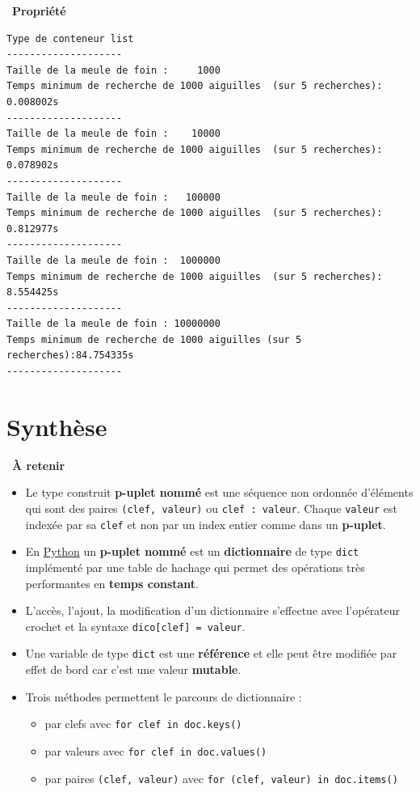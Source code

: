 \documentclass[
  11pt,
]{article}
\newcommand{\passthrough}[1]{#1}
\providecommand{\tightlist}{%
  \setlength{\itemsep}{0pt}\setlength{\parskip}{0pt}}
\newcounter{prop}
\newenvironment{propriete}[1]
{\par \medskip   \addtocounter{prop}{1} \noindent  
\begin{bclogo}[arrondi =0.1,  ombre = true, barre=none, logo=\bcbook, marge=4]{~\textbf{Propriété} \textbf{\theprop} {\itshape #1} }   \par}
{
\end{bclogo}
 \par \bigskip }
\newcounter{cours}
\newenvironment{memo}[1]
{\par \medskip    \noindent  
\begin{bclogo}[arrondi =0.1,  ombre = true, barre=none, logo=\bccle, marge=4]{~\textbf{À retenir}  {\itshape #1} }  \par}
{
\end{bclogo}
 \par \bigskip }
\begin{document}
\begin{propriete}{}
\begin{lstlisting}
Type de conteneur list
--------------------
Taille de la meule de foin :     1000
Temps minimum de recherche de 1000 aiguilles  (sur 5 recherches): 0.008002s
--------------------
Taille de la meule de foin :    10000
Temps minimum de recherche de 1000 aiguilles  (sur 5 recherches): 0.078902s
--------------------
Taille de la meule de foin :   100000
Temps minimum de recherche de 1000 aiguilles  (sur 5 recherches): 0.812977s
--------------------
Taille de la meule de foin :  1000000
Temps minimum de recherche de 1000 aiguilles  (sur 5 recherches): 8.554425s
--------------------
Taille de la meule de foin : 10000000
Temps minimum de recherche de 1000 aiguilles (sur 5 recherches):84.754335s
--------------------
\end{lstlisting}

\end{propriete}

\hypertarget{synthuxe8se}{%
\section{Synthèse}\label{synthuxe8se}}

\begin{memo}{}

\begin{itemize}
\tightlist
\item
  Le type construit \textbf{p-uplet nommé} est une séquence non ordonnée
  d'éléments qui sont des paires
  \passthrough{\lstinline!(clef, valeur)!} ou
  \passthrough{\lstinline!clef : valeur!}. Chaque
  \passthrough{\lstinline!valeur!} est indexée par sa
  \passthrough{\lstinline!clef!} et non par un index entier comme dans
  un \textbf{p-uplet}.
\item
  En
  \href{https://docs.python.org/3/tutorial/datastructures.html}{Python}
  un \textbf{p-uplet nommé} est un \textbf{dictionnaire} de type
  \passthrough{\lstinline!dict!} implémenté par une table de hachage qui
  permet des opérations très performantes en \textbf{temps constant}.
\item
  L'accès, l'ajout, la modification d'un dictionnaire s'effectue avec
  l'opérateur crochet et la syntaxe
  \passthrough{\lstinline!dico[clef] = valeur!}.
\item
  Une variable de type \passthrough{\lstinline!dict!} est une
  \textbf{référence} et elle peut être modifiée par effet de bord car
  c'est une valeur \textbf{mutable}.
\item
  Trois méthodes permettent le parcours de dictionnaire :

  \begin{itemize}
  \tightlist
  \item
    par clefs avec \passthrough{\lstinline!for clef in doc.keys()!}
  \item
    par valeurs avec \passthrough{\lstinline!for clef in doc.values()!}
  \item
    par paires \passthrough{\lstinline!(clef, valeur)!} avec
    \passthrough{\lstinline!for (clef, valeur) in doc.items()!}
  \end{itemize}
\end{itemize}

\end{memo}
\end{document}
